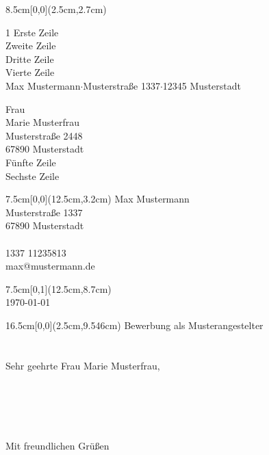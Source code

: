 \documentclass[a4paper,11pt]{article}
\begin{document}
%
\begin{textblock*}{8.5cm}[0,0](2.5cm,2.7cm)%
\vspace{1mm}
\begin{spacing}{1}
\scriptsize
\noindent Erste Zeile\\
Zweite Zeile\\
Dritte Zeile\\
Vierte Zeile\\
Max Mustermann$\cdot$Musterstraße 1337$\cdot$12345 Musterstadt
\end{spacing}
\vspace{2mm}
\noindent Frau\\
Marie Musterfrau\\
Musterstraße 2448\\
67890 Musterstadt\\
Fünfte Zeile\\
Sechste Zeile
\end{textblock*}
%
\begin{textblock*}{7.5cm}[0,0](12.5cm,3.2cm)
\noindent
Max Mustermann\\
Musterstraße 1337\\
67890 Musterstadt\\
~\\
1337 11235813\\
max@mustermann.de
\end{textblock*}
%
\begin{textblock*}{7.5cm}[0,1](12.5cm,8.7cm)
~\\
\noindent\today
\end{textblock*}
%
\begin{textblock*}{16.5cm}[0,0](2.5cm,9.546cm)
\RaggedRight
\noindent
Bewerbung als Musterangestelter\\
~\\
~\\
Sehr geehrte Frau Marie Musterfrau,\\
~\\
\lipsum[1]\\
~\\
\lipsum[1]\\
~\\
Mit freundlichen Gr\"ußen
\end{textblock*}
%
\end{document}

